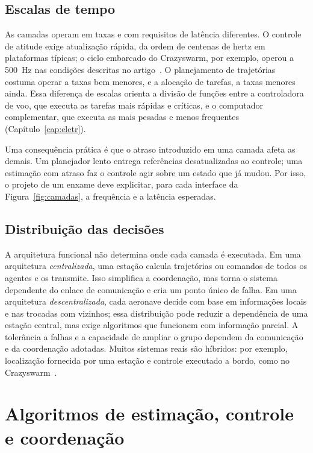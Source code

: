 \documentclass[11pt,a4paper,oneside]{book}
\numberwithin{equation}{chapter}
\begin{document}
\section{Escalas de tempo}
As camadas operam em taxas e com requisitos de latência diferentes. O controle de atitude exige atualização rápida, da ordem de centenas de hertz em plataformas típicas; o ciclo embarcado do Crazyswarm, por exemplo, operou a 500~Hz nas condições descritas no artigo~\cite{crazyswarm}. O planejamento de trajetórias costuma operar a taxas bem menores, e a alocação de tarefas, a taxas menores ainda. Essa diferença de escalas orienta a divisão de funções entre a controladora de voo, que executa as tarefas mais rápidas e críticas, e o computador complementar, que executa as mais pesadas e menos frequentes (Capítulo~\ref{cap:eletr}).

Uma consequência prática é que o atraso introduzido em uma camada afeta as demais. Um planejador lento entrega referências desatualizadas ao controle; uma estimação com atraso faz o controle agir sobre um estado que já mudou. Por isso, o projeto de um enxame deve explicitar, para cada interface da Figura~\ref{fig:camadas}, a frequência e a latência esperadas.

\section{Distribuição das decisões}
A arquitetura funcional não determina onde cada camada é executada. Em uma arquitetura \emph{centralizada}, uma estação calcula trajetórias ou comandos de todos os agentes e os transmite. Isso simplifica a coordenação, mas torna o sistema dependente do enlace de comunicação e cria um ponto único de falha. Em uma arquitetura \emph{descentralizada}, cada aeronave decide com base em informações locais e nas trocadas com vizinhos; essa distribuição pode reduzir a dependência de uma estação central, mas exige algoritmos que funcionem com informação parcial. A tolerância a falhas e a capacidade de ampliar o grupo dependem da comunicação e da coordenação adotadas. Muitos sistemas reais são híbridos: por exemplo, localização fornecida por uma estação e controle executado a bordo, como no Crazyswarm~\cite{crazyswarm}.

\chapter{Algoritmos de estimação, controle e coordenação}\label{cap:alg}
\end{document}
